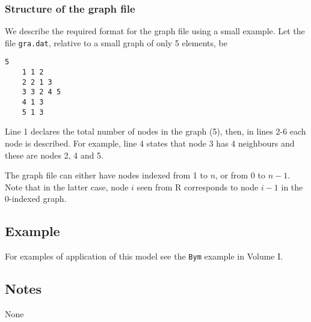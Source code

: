 \documentclass[a4paper,11pt]{article}
\begin{document}
\subsubsection*{Structure of the graph file}

We describe the required format for the graph file using a small
example. Let the file {\tt gra.dat}, relative to a small graph of only
5 elements, be
\begin{lstlisting}[basicstyle=\footnotesize]
    5
    1 1 2
    2 2 1 3
    3 3 2 4 5 
    4 1 3
    5 1 3
\end{lstlisting}
Line 1 declares the total number of nodes in the graph (5), then, in
lines 2-6 each node is described. For example, line 4 states that node
3 has 4 neighbours and these are nodes 2, 4 and 5.

The graph file can either have nodes indexed from 1 to $n$, or from 0
to $n-1$.  Note that in the latter case, node $i$ seen from R
corresponds to node $i-1$ in the 0-indexed graph.

\subsection*{Example}

For examples of application of this model see the {\tt Bym} example in
Volume I.

\subsection*{Notes}

None
\end{document}
